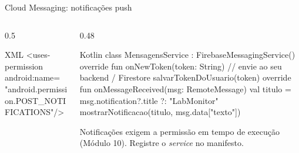 \documentclass[aspectratio=169,10pt]{beamer}
\begin{document}
\begin{frame}[fragile]{Cloud Messaging: notificações push}
  \begin{columns}[T]
    \begin{column}{0.5\textwidth}
      \centering
\begin{codigo}[title=AndroidManifest.xml]{XML}
<uses-permission android:name=
  "android.permission.POST_NOTIFICATIONS"/>
\end{codigo}
    \end{column}
    \begin{column}{0.48\textwidth}
\begin{codigo}[title=MensagensService.kt]{Kotlin}
class MensagensService : FirebaseMessagingService() {
  override fun onNewToken(token: String) {
    // envie ao seu backend / Firestore
    salvarTokenDoUsuario(token)
  }
  override fun onMessageReceived(msg: RemoteMessage) {
    val titulo = msg.notification?.title ?: "LabMonitor"
    mostrarNotificacao(titulo, msg.data["texto"])
  }
}
\end{codigo}
      \begin{atencao}[Android 13+]
        Notificações exigem a permissão em tempo de execução  (Módulo 10). Registre o \emph{service} no manifesto.
      \end{atencao}
    \end{column}
  \end{columns}
\end{frame}
\end{document}
